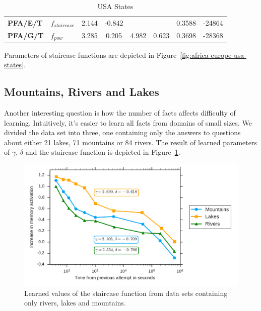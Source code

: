 \begin{table}
\begin{threeparttable}
\begin{subtable}{\linewidth}
\begin{tabular}{ p{2cm} l
                       S[table-format=1.3] S[table-format=1.3]
                       S[table-format=1.3] S[table-format=1.3]
                       S[table-format=1.4] S[table-format=5] }
       \textbf{PFA/E/T}  & $f_{\mathit{staircase}}$
          & 2.144 & -0.842 &       &       & 0.3588 & -24864 \\
       \textbf{PFA/G/T}  & $f_{\mathit{pow}}$
          & 3.285 &  0.205 & 4.982 & 0.623 & 0.3698 & -28368 \\
       \bottomrule[\heavyrulewidth]
       \bottomrule[\heavyrulewidth]
      \end{tabular}
      \caption{USA States}
      \label{table:results-usa-states}
    \end{subtable}
    \begin{tablenotes}
      \item[1] Parameters of staircase functions are depicted in Figure~\ref{fig:africa-europe-usa-states}.
    \end{tablenotes}
  \end{threeparttable}
  \label{table:results-countries}
\end{table}

\subsection{Mountains, Rivers and Lakes}

Another interesting question is how the number of facts affects difficulty of learning. Intuitively, it's easier to learn all facts from domains of small sizes. We divided the data set into three, one containing only the answers to questions about either 21 lakes, 71 mountains or 84 rivers. The result of learned parameters of $\gamma$, $\delta$ and the staircase function is depicted in Figure~\ref{fig:lakes-rivers-mountains}.

\begin{figure}[htbp]
  \centering
  \includegraphics[width=\textwidth]{img/lakes-rivers-mountains}
  \caption{Learned values of the staircase function from data sets containing only rivers, lakes and mountains.}
  \label{fig:lakes-rivers-mountains}
\end{figure}

